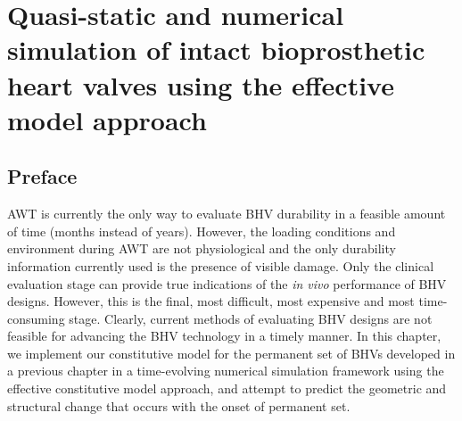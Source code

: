 \chapter{Quasi-static and numerical simulation of intact bioprosthetic heart valves using the effective model approach}

\section*{Preface}
%

    AWT is currently the only way to evaluate BHV durability in a feasible amount of time (months instead of years). However, the loading conditions and environment during AWT are not physiological and the only durability information currently used is the presence of visible damage. Only the clinical evaluation stage can provide true indications of the \textit{in vivo} performance of BHV designs. However, this is the final, most difficult, most expensive and most time-consuming stage. Clearly, current methods of evaluating BHV designs are not feasible for advancing the BHV technology in a timely manner. In this chapter, we implement our constitutive model for the permanent set of BHVs developed in a previous chapter in a time-evolving numerical simulation framework using the effective constitutive model approach, and attempt to predict the geometric and structural change that occurs with the onset of permanent set. 














\newpage


